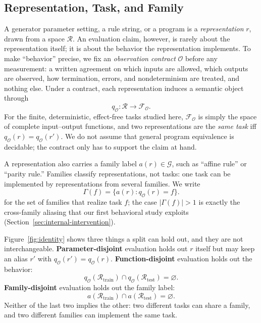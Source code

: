 \documentclass[twoside,11pt]{article}
\begin{document}
\subsection{Representation, Task, and Family}

A generator parameter setting, a rule string, or a program is a
\emph{representation} $r$, drawn from a space $\mathcal R$.  An evaluation
claim, however, is rarely about the representation itself; it is about the
behavior the representation implements.  To make ``behavior'' precise, we
fix an \emph{observation contract} $\mathcal O$ before any measurement: a
written agreement on which inputs are allowed, which outputs are observed,
how termination, errors, and nondeterminism are treated, and nothing else.
Under a contract, each representation induces a semantic object through
\begin{equation}
q_{\mathcal O}:\mathcal R\rightarrow\mathcal F_{\mathcal O}.
\end{equation}
For the finite, deterministic, effect-free tasks studied here,
$\mathcal F_{\mathcal O}$ is simply the space of complete input--output
functions, and two representations are the \emph{same task} iff
$q_{\mathcal O}(r)=q_{\mathcal O}(r')$.  We do not assume that general
program equivalence is decidable; the contract only has to support the claim
at hand.

A representation also carries a family label $a(r)\in\mathcal G$, such as
``affine rule'' or ``parity rule.''  Families classify representations, not
tasks: one task can be implemented by representations from several families.
We write
\begin{equation}
\Gamma(f)=\{a(r):q_{\mathcal O}(r)=f\}.
\label{eq:family-relation}
\end{equation}
for the set of families that realize task $f$; the case $|\Gamma(f)|>1$ is
exactly the cross-family aliasing that our first behavioral study exploits
(Section~\ref{sec:internal-intervention}).

Figure~\ref{fig:identity} shows three things a split can hold out, and they
are not interchangeable.  \textbf{Parameter-disjoint} evaluation holds out
$r$ itself but may keep an alias $r'$ with
$q_{\mathcal O}(r')=q_{\mathcal O}(r)$.  \textbf{Function-disjoint}
evaluation holds out the behavior:
\begin{equation}
q_{\mathcal O}(\mathcal R_{\mathrm{train}})
\cap
q_{\mathcal O}(\mathcal R_{\mathrm{test}})
=\varnothing.
\label{eq:function-disjoint}
\end{equation}
\textbf{Family-disjoint} evaluation holds out the family label:
\begin{equation}
a(\mathcal R_{\mathrm{train}})
\cap
a(\mathcal R_{\mathrm{test}})
=\varnothing.
\label{eq:family-disjoint}
\end{equation}
Neither of the last two implies the other: two different tasks can share a
family, and two different families can implement the same task.
\end{document}
